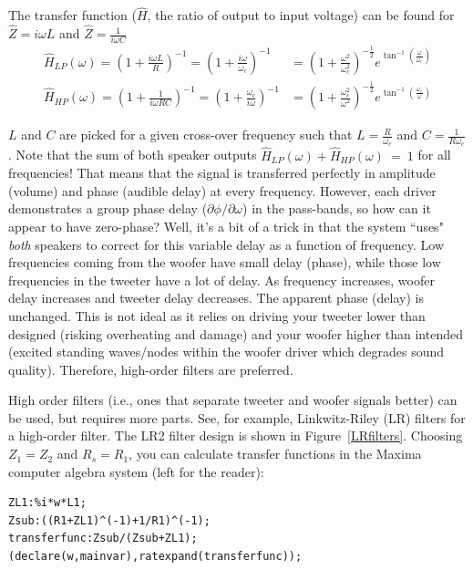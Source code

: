 \documentclass[10pt,letterpaper]{article}
\begin{document}
The transfer function ($\hat{H}$, the ratio of output to input voltage) can be found for $\hat{Z}=i\omega L$ and $\hat{Z}=\frac{1}{i\omega C}$
\begin{align}
\hat{H}_{LP}(\omega)=\left( {1+\frac{i\omega L}{R}} \right)^{-1}
=\left( {1+\frac{i\omega}{\omega_c}} \right)^{-1}
&=\left( {1+\frac{\omega^2}{ \omega_c^2}}\right)^{-\frac{1}{2}} e^{\tan^{-1}\left( \frac{\omega}{\omega_c}\right)}\\
\hat{H}_{HP}(\omega)
=\left( {1+\frac{1}{i \omega R C}} \right)^{-1}
=\left( {1+\frac{\omega_c}{i \omega}} \right)^{-1}
&=\left( {1+\frac{\omega_c^2}{\omega^2 }}\right)^{-\frac{1}{2}} e^{\tan^{-1}\left( \frac{\omega_c}{\omega}\right)}
\end{align}

$L$ and $C$ are picked for a given cross-over frequency such that $L=\frac{R}{\omega_c}$ and $C=\frac{1}{R\omega_c}$. Note that the sum of both speaker outputs $\hat{H}_{LP}(\omega)+\hat{H}_{HP}(\omega)~=~1$ for all frequencies! That means that the signal is transferred perfectly in amplitude (volume) and phase (audible delay) at every frequency. However, each driver demonstrates a group phase delay ($\partial \phi / \partial \omega$) in the pass-bands, so how can it appear to have zero-phase? Well, it's a bit of a trick in that the system ``uses"  \textit{both} speakers to correct for this variable delay as a function of frequency. Low frequencies coming from the woofer have small delay (phase), while those low frequencies in the tweeter have a lot of delay. As frequency increases, woofer delay increases and tweeter delay decreases. The apparent phase (delay) is unchanged. This is not ideal as it relies on driving your tweeter lower than designed (risking overheating and damage) and your woofer higher than intended (excited standing waves/nodes within the woofer driver which degrades sound quality). Therefore, high-order filters are preferred.

High order filters (i.e., ones that separate tweeter and woofer signals better) can be used, but requires more parts. See, for example, Linkwitz-Riley (LR) filters for a high-order filter. The LR2 filter design is shown in Figure~\ref{LRfilters}. Choosing $Z_1=Z_2$ and $R_s=R_1$, you can calculate transfer functions in the Maxima computer algebra system (left for the reader):
\begin{verbatim}
ZL1:%i*w*L1;
Zsub:((R1+ZL1)^(-1)+1/R1)^(-1);
transferfunc:Zsub/(Zsub+ZL1);
(declare(w,mainvar),ratexpand(transferfunc));
\end{verbatim}
\end{document}
